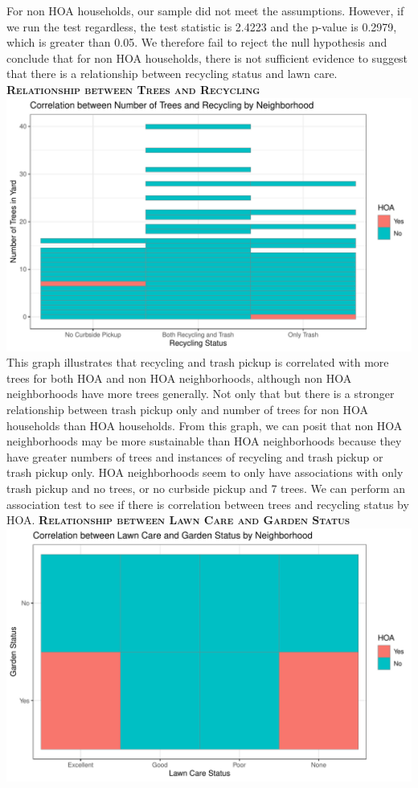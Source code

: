 \documentclass{article}
\begin{document}
For non HOA households, our sample did not meet the assumptions. However, if we run the test regardless, the test statistic is 2.4223 and the p-value is 0.2979, which is greater than 0.05. We therefore fail to reject the null hypothesis and conclude that for non HOA households, there is not sufficient evidence to suggest that there is a relationship between recycling status and lawn care.
\newpage
\textsc{\textbf{Relationship between Trees and Recycling}}
\newline
\newline
\includegraphics{part2-034}
\newline
This graph illustrates that recycling and trash pickup is correlated with more trees for both HOA and non HOA neighborhoods, although non HOA neighborhoods have more trees generally. Not only that but there is a stronger relationship between trash pickup only and number of trees for non HOA households than HOA households. From this graph, we can posit that non HOA neighborhoods may be more sustainable than HOA neighborhoods because they have greater numbers of trees and instances of recycling and trash pickup or trash pickup only. HOA neighborhoods seem to only have associations with only trash pickup and no trees, or no curbside pickup and 7 trees.
\newline
We can perform an association test to see if there is correlation between trees and recycling status by HOA. 
\newpage
\textsc{\textbf{Relationship between Lawn Care and Garden Status}}
\newline
\newline
\includegraphics{part2-035}
\end{document}
